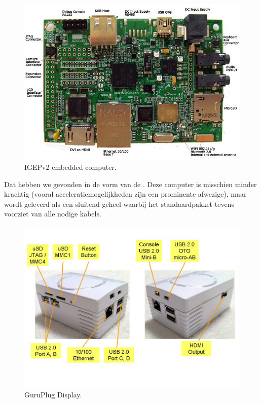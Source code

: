 \begin{figure}
	\includegraphics[width=\textwidth]{afbeeldingen/IGEPv2}
	\caption{IGEPv2 embedded computer.}
\end{figure}

Dat hebben we gevonden in de vorm van de . Deze computer is misschien minder krachtig (vooral acceleratiemogelijkheden zijn een prominente afwezige), maar wordt geleverd als een sluitend geheel waarbij het standaardpakket tevens voorziet van alle nodige kabels.

\begin{figure}
	\includegraphics[width=\textwidth]{afbeeldingen/GuruPlug_Display}
	\caption{GuruPlug Display.}
\end{figure}

